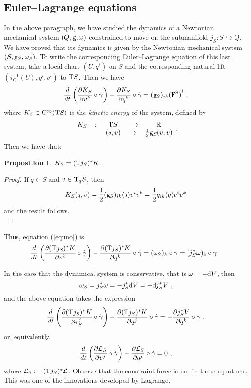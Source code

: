 \documentclass[12pt]{report}
\newtheorem{prop}[teor]{Proposition}
\def\beq{\begin{equation}}
\def\eeq{\end{equation}}
\def\derpar#1#2{\frac{\partial{#1}}{\partial{#2}}}
\def\qed{\ifvmode\removelastskip\fi
{\unskip\nobreak\hfil\penalty50\hbox{}\nobreak\hfil
\hbox{\vrule height1.2ex width1.2ex}\parfillskip=0pt
\finalhyphendemerits=0 \par\smallskip}}
\def\Lag{{\cal L}}
\def\d{{\rm d}}
\def\Real{\mathbb{R}}
\def\Tan{{\rm T}}
\def\Cinfty{{\rm C}^\infty}
\begin{document}
\subsection{Euler--Lagrange equations}


In the above paragraph, we have studied the dynamics of a Newtonian mechanical system $(Q,{\tt g},\omega)$
constrained to move on the submanifold $j_S\colon S\hookrightarrow Q$. We have proved that its dynamics is given by the Newtonian mechanical system $(S,{\tt g}_S,\omega_S)$.
To write the corresponding Euler--Lagrange equation of this last system, take a local chart $(U,q^i)$ on $S$ and the corresponding natural lift $(\tau_Q^{-1}(U),q^i,v^i)$
to $\Tan S$. Then we have
\beq
\frac{d}{d t}\left(\derpar{K_S}{v^k}\circ\dot\gamma\right)-
\derpar{K_S}{q^k}\circ\dot\gamma=
({\tt g}_S)_{ik}{(\rm F^S)}^i \ ,
\label{equno}
\eeq
where $K_S\in\Cinfty(\Tan S)$ is the {\sl kinetic energy} of the system, defined by
$$
\begin{array}{ccccc}
K_S & \colon & \Tan S & \longrightarrow & \Real  \\
& & (q,v) &\mapsto & \frac{1}{2}{\tt g}_S(v,v)
\end{array}.
$$
Then we have that:

\begin{prop}
$K_S=(\Tan j_S)^*K$.
\end{prop}
\begin{proof}
If $q\in S$ and $v\in\Tan_qS$, then 
$$
K_S(q,v)=\frac{1}{2}({\tt g}_S)_{ik}(q)v^iv^k=\frac{1}{2}g_{ik}(q)v^iv^k
$$
and the result follows.
\\ \qed \end{proof}

Thus, equation (\ref{equno}) is
$$
\frac{d}{d t}\left(\derpar{(\Tan j_S)^*K}{v^k}\circ\dot\gamma\right)-
\derpar{(\Tan j_S)^*K}{q^k}\circ\dot\gamma=
(\omega_S)_k\circ\gamma =(j_S^*\omega)_k\circ\gamma \ .
$$

In the case that the dynamical system is conservative, that is $\omega=-\d V$,
then
$$
\omega_S=j_S^*\omega=-j_S^*\d V=-\d j_S^*V \ ,
$$
and the above equation takes the expression
$$
\frac{d}{d t}\left(\derpar{(\Tan j_S)^*K}{v^j_S}\circ\dot\gamma\right)-
\derpar{(\Tan j_S)^*K}{q^j}\circ\dot\gamma=
-\derpar{j_S^*V}{q^k}\circ\gamma \ ,
$$
or, equivalently,
$$
\frac{d}{d t}\left(\derpar{\Lag_S}{v^j}\circ\dot\gamma\right)-
\derpar{\Lag_S}{q^j}\circ\dot\gamma=0 \ ,
$$
where $\Lag_S:=(\Tan j_S)^*\Lag$.
Observe that the constraint force is not in these equations. This was one of the innovations developed by Lagrange.
\end{document}
